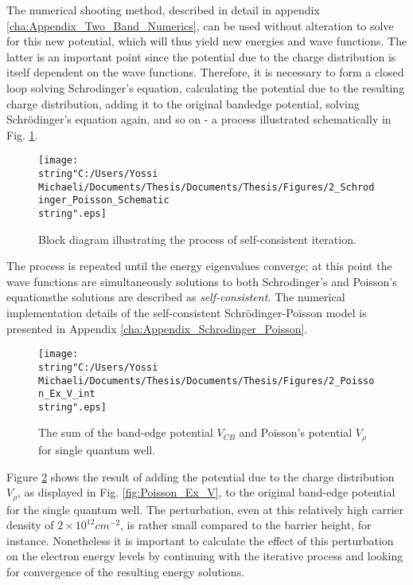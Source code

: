 The numerical shooting method, described in detail in appendix \ref{cha:Appendix_Two_Band_Numerics},
can be used without alteration to solve for this new potential, which
will thus yield new energies and wave functions. The latter is an
important point since the potential due to the charge distribution
is itself dependent on the wave functions. Therefore, it is necessary
to form a closed loop solving Schrodinger's equation, calculating
the potential due to the resulting charge distribution, adding it
to the original bandedge potential, solving Schr\"{o}dinger's equation
again, and so on - a process illustrated schematically in Fig. \ref{fig:Schrodinger_Poisson_Schematic}.%
\begin{figure}
\begin{centering}
\texttt{[image: \\string"C:/Users/Yossi Michaeli/Documents/Thesis/Documents/Thesis/Figures/2\_Schrodinger\_Poisson\_Schematic\\string".eps]}
\par\end{centering}

\caption{\label{fig:Schrodinger_Poisson_Schematic}Block diagram illustrating
the process of self-consistent iteration.}



\end{figure}
 The process is repeated until the energy eigenvalues converge; at
this point the wave functions are simultaneously solutions to both
Schrodinger's and Poisson's equations\textemdash{}the solutions are
described as \emph{self-consistent. }The numerical implementation
details of the self-consistent Schr\"{o}dinger-Poisson model is presented
in Appendix \ref{cha:Appendix_Schrodinger_Poisson}.

%
\begin{figure}
\begin{centering}
\texttt{[image: \\string"C:/Users/Yossi Michaeli/Documents/Thesis/Documents/Thesis/Figures/2\_Poisson\_Ex\_V\_int\\string".eps]}
\par\end{centering}

\caption{\label{fig:Poisson_Ex_V_int}The sum of the band-edge potential $V_{CB}$
and Poisson's potential $V_{\rho}$ for single quantum well.}



\end{figure}
Figure \ref{fig:Poisson_Ex_V_int} shows the result of adding the
potential due to the charge distribution $V_{\rho}$, as displayed
in Fig. \ref{fig:Poisson_Ex_V}, to the original band-edge potential
 for the single quantum well. The perturbation, even at this relatively
high carrier density of $2\times10^{12}cm^{-2}$, is rather small
compared to the barrier height, for instance. Nonetheless it is important
to calculate the effect of this perturbation on the electron energy
levels by continuing with the iterative process and looking for convergence
of the resulting energy solutions.


